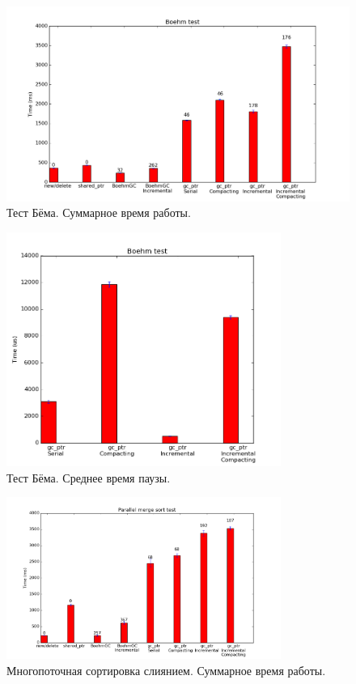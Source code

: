 \begin{figure}[ht!]
\centering
\includegraphics[width=\textwidth]{Moiseenko/images/boehm_all.png}
\caption{Тест Бёма. Суммарное время работы.}
\label{fig:boehm}
\end{figure}

\begin{figure}[h!]
\centering
\includegraphics[width=0.8\textwidth]{Moiseenko/images/boehm_pause_all.png}
\caption{Тест Бёма. Среднее время паузы.}
\label{fig:boehm_pause}
\end{figure}

\begin{figure}[h!]
\centering
\includegraphics[width=0.8\textwidth]{Moiseenko/images/merge_sort_all.png}
\caption{Многопоточная сортировка слиянием. Суммарное время работы.}
\label{fig:merge_sort}
\end{figure}

